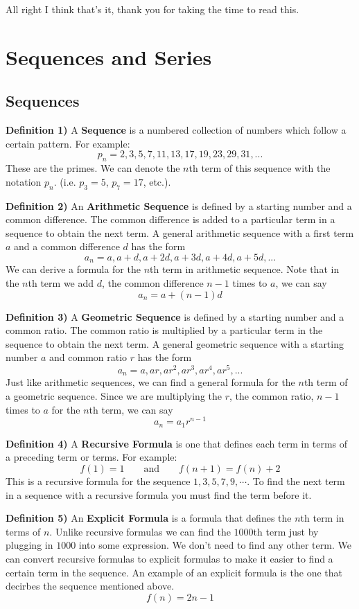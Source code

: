 \documentclass[a4paper]{article}
\begin{document}
All right I think that's it, thank you for taking the time to read this.

\vfill
{}

\newpage
\section{Sequences and Series}
\subsection{Sequences}

\textbf{Definition 1)} A \textbf{Sequence} is a numbered collection of numbers which follow a certain pattern. For example:
$$p_n = 2, 3, 5, 7, 11, 13, 17, 19, 23, 29, 31, ... $$
These are the primes. We can denote the $n$th term of this sequence with the notation $p_n$. (i.e. 
$p_3=5$, $p_7=17$, etc.).

\textbf{Definition 2)} An \textbf{Arithmetic Sequence} is defined by a starting number and a common difference. The common difference is added to a particular term in a sequence to obtain the next term. A general arithmetic sequence with a first term $a$ and a common difference $d$ has the form
$$a_n = a, a+d, a+2d, a+3d, a+4d, a+5d, ...$$
We can derive a formula for the $n$th term in arithmetic sequence. Note that in the $n$th term we add $d$, the common difference $n-1$ times to $a$, we can say
$$a_n=a+(n-1)d$$

\textbf{Definition 3)} A \textbf{Geometric Sequence} is defined by a starting number and a common ratio. 
The common ratio is  multiplied by a particular term in the sequence to obtain the next term. A general 
geometric sequence with a starting number $a$ and common ratio $r$ has the form
$$a_n=a, ar, ar^2, ar^3, ar^4, ar^5, ...$$
Just like arithmetic sequences, we can find a general formula for the $n$th term of a geometric sequence.
Since we are multiplying the $r$, the common ratio, $n-1$ times to $a$ for the $n$th term, we can say
$$a_n=a_1r^{n-1}$$

\textbf{Definition 4)} A \textbf{Recursive Formula} is one that defines each term in terms of a preceding term or terms. For example:
$$f(1)=1 \qquad \text{and} \qquad f(n+1)=f(n)+2$$
This is a recursive formula for the sequence $1, 3, 5, 7, 9, \cdots$. To find the next term in a sequence with a recursive formula you must find the term before it.

\textbf{Definition 5)} An \textbf{Explicit Formula} is a formula that defines the $n$th term in terms of $n$. Unlike recursive formulas we can find the $1000$th term just by plugging in $1000$ into some expression. We don't need to find any other term. We can convert recursive formulas to explicit formulas to make it easier to find a certain term in the sequence. An example of an explicit formula is the one that decirbes the sequence mentioned above.
$$f(n)=2n-1$$
\end{document}
